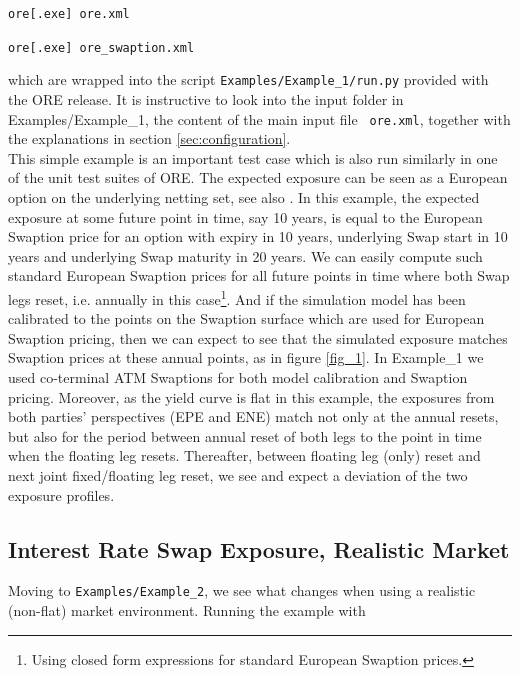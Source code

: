 \medskip
\centerline{\tt ore[.exe] ore.xml}

\centerline{\tt ore[.exe] ore\_swaption.xml}
\medskip

which are wrapped into the script {\tt Examples/Example\_1/run.py} provided with the ORE release.
It is instructive to look into the input folder in Examples/Example\_1, the content of the main input file {\tt
  ore.xml}, together with the explanations in section \ref{sec:configuration}. \\

This simple example is an important test case which is also run similarly in one of the unit test suites of ORE. The
expected exposure can be seen as a European option on the underlying netting set, see also \cite{methods}.
In this example, the expected exposure at some future point in time, say 10 years, is equal to
the European Swaption price for an option with expiry in 10 years, underlying Swap start in 10 years and underlying Swap
maturity in 20 years. We can easily compute such standard European Swaption prices for all future points in time where
both Swap legs reset, i.e. annually in this case\footnote{Using closed form expressions for standard European Swaption
  prices.}. And if the simulation model has been calibrated to the points on the Swaption surface which are used for
European Swaption pricing, then we can expect to see that the simulated exposure matches Swaption prices at these annual
points, as in figure \ref{fig_1}.  In Example\_1 we used co-terminal ATM Swaptions for both model calibration and
Swaption pricing. Moreover, as the yield curve is flat in this example, the exposures from both parties'
perspectives (EPE and ENE) match not only at the annual resets, but also for the period between annual reset of both
legs to the point in time when the floating leg resets. Thereafter, between floating leg (only) reset and next joint
fixed/floating leg reset, we see and expect a deviation of the two exposure profiles.

\subsection{Interest Rate Swap Exposure, Realistic Market}\label{sec:example2}

Moving to {\tt Examples/Example\_2}, we see what changes when using a realistic (non-flat) market
environment. Running the example with

